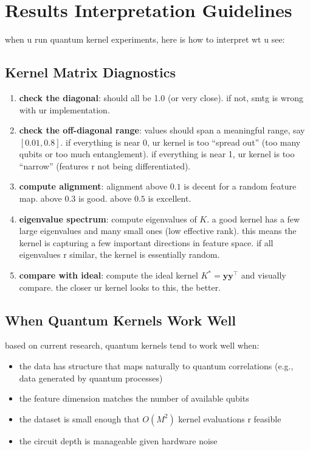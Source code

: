 \documentclass[11pt,a4paper]{article}
\theoremstyle{definition}
\theoremstyle{remark}
\begin{document}
\section{Results Interpretation Guidelines}

when u run quantum kernel experiments, here is how to interpret wt u see:

\subsection{Kernel Matrix Diagnostics}

\begin{enumerate}[leftmargin=*]
    \item \textbf{check the diagonal}: should all be 1.0 (or very close). if not, smtg is wrong with ur implementation.

    \item \textbf{check the off-diagonal range}: values should span a meaningful range, say $[0.01, 0.8]$. if everything is near 0, ur kernel is too ``spread out'' (too many qubits or too much entanglement). if everything is near 1, ur kernel is too ``narrow'' (features r not being differentiated).

    \item \textbf{compute alignment}: alignment above $0.1$ is decent for a random feature map. above $0.3$ is good. above $0.5$ is excellent.

    \item \textbf{eigenvalue spectrum}: compute eigenvalues of $K$. a good kernel has a few large eigenvalues and many small ones (low effective rank). this means the kernel is capturing a few important directions in feature space. if all eigenvalues r similar, the kernel is essentially random.

    \item \textbf{compare with ideal}: compute the ideal kernel $K^* = \mathbf{y}\mathbf{y}^\top$ and visually compare. the closer ur kernel looks to this, the better.
\end{enumerate}

\subsection{When Quantum Kernels Work Well}

based on current research, quantum kernels tend to work well when:
\begin{itemize}[leftmargin=*]
    \item the data has structure that maps naturally to quantum correlations (e.g., data generated by quantum processes)
    \item the feature dimension matches the number of available qubits
    \item the dataset is small enough that $O(M^2)$ kernel evaluations r feasible
    \item the circuit depth is manageable given hardware noise
\end{itemize}
\end{document}
